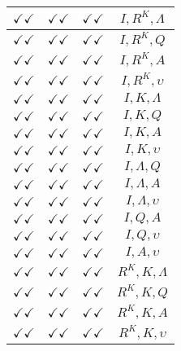 \documentclass[a4paper,10pt]{article}
\begin{document}
\begin{longtable}{|c|c|c|c|}
\hline
$\checkmark\checkmark$ & $\checkmark\checkmark$ & $\checkmark\checkmark$ & ${I},{R^{K}},{\Lambda}$ \\
\hline
$\checkmark\checkmark$ & $\checkmark\checkmark$ & $\checkmark\checkmark$ & ${I},{R^{K}},{Q}$ \\
\hline
$\checkmark\checkmark$ & $\checkmark\checkmark$ & $\checkmark\checkmark$ & ${I},{R^{K}},{A}$ \\
\hline
$\checkmark\checkmark$ & $\checkmark\checkmark$ & $\checkmark\checkmark$ & ${I},{R^{K}},{\upsilon}$ \\
\hline
$\checkmark\checkmark$ & $\checkmark\checkmark$ & $\checkmark\checkmark$ & ${I},{K},{\Lambda}$ \\
\hline
$\checkmark\checkmark$ & $\checkmark\checkmark$ & $\checkmark\checkmark$ & ${I},{K},{Q}$ \\
\hline
$\checkmark\checkmark$ & $\checkmark\checkmark$ & $\checkmark\checkmark$ & ${I},{K},{A}$ \\
\hline
$\checkmark\checkmark$ & $\checkmark\checkmark$ & $\checkmark\checkmark$ & ${I},{K},{\upsilon}$ \\
\hline
$\checkmark\checkmark$ & $\checkmark\checkmark$ & $\checkmark\checkmark$ & ${I},{\Lambda},{Q}$ \\
\hline
$\checkmark\checkmark$ & $\checkmark\checkmark$ & $\checkmark\checkmark$ & ${I},{\Lambda},{A}$ \\
\hline
$\checkmark\checkmark$ & $\checkmark\checkmark$ & $\checkmark\checkmark$ & ${I},{\Lambda},{\upsilon}$ \\
\hline
$\checkmark\checkmark$ & $\checkmark\checkmark$ & $\checkmark\checkmark$ & ${I},{Q},{A}$ \\
\hline
$\checkmark\checkmark$ & $\checkmark\checkmark$ & $\checkmark\checkmark$ & ${I},{Q},{\upsilon}$ \\
\hline
$\checkmark\checkmark$ & $\checkmark\checkmark$ & $\checkmark\checkmark$ & ${I},{A},{\upsilon}$ \\
\hline
$\checkmark\checkmark$ & $\checkmark\checkmark$ & $\checkmark\checkmark$ & ${R^{K}},{K},{\Lambda}$ \\
\hline
$\checkmark\checkmark$ & $\checkmark\checkmark$ & $\checkmark\checkmark$ & ${R^{K}},{K},{Q}$ \\
\hline
$\checkmark\checkmark$ & $\checkmark\checkmark$ & $\checkmark\checkmark$ & ${R^{K}},{K},{A}$ \\
\hline
$\checkmark\checkmark$ & $\checkmark\checkmark$ & $\checkmark\checkmark$ & ${R^{K}},{K},{\upsilon}$ \\

\end{longtable}
\end{document}
